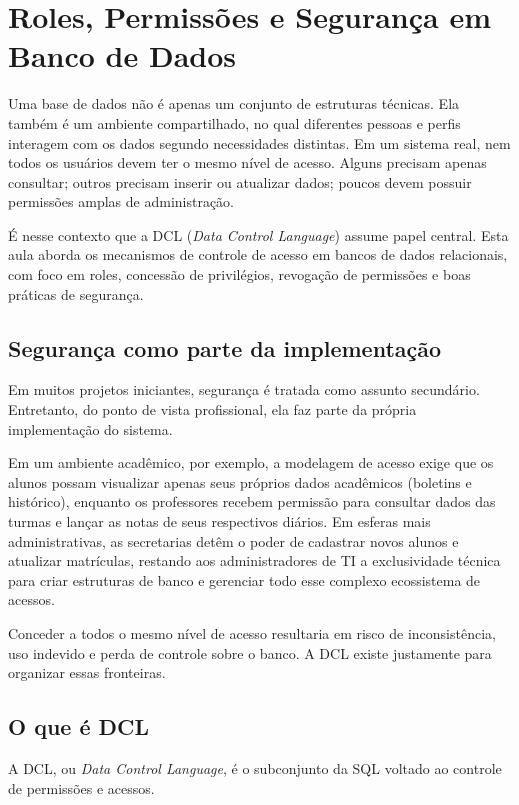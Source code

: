 \chapter{Roles, Permissões e Segurança em Banco de Dados}
\label{cap:roles_permissoes_seguranca}

Uma base de dados não é apenas um conjunto de estruturas técnicas. Ela também é um ambiente compartilhado, no qual diferentes pessoas e perfis interagem com os dados segundo necessidades distintas. Em um sistema real, nem todos os usuários devem ter o mesmo nível de acesso. Alguns precisam apenas consultar; outros precisam inserir ou atualizar dados; poucos devem possuir permissões amplas de administração.

É nesse contexto que a DCL (\textit{Data Control Language}) assume papel central. Esta aula aborda os mecanismos de controle de acesso em bancos de dados relacionais, com foco em roles, concessão de privilégios, revogação de permissões e boas práticas de segurança.

\section{Segurança como parte da implementação}

Em muitos projetos iniciantes, segurança é tratada como assunto secundário. Entretanto, do ponto de vista profissional, ela faz parte da própria implementação do sistema.

Em um ambiente acadêmico, por exemplo, a modelagem de acesso exige que os alunos possam visualizar apenas seus próprios dados acadêmicos (boletins e histórico), enquanto os professores recebem permissão para consultar dados das turmas e lançar as notas de seus respectivos diários. Em esferas mais administrativas, as secretarias detêm o poder de cadastrar novos alunos e atualizar matrículas, restando aos administradores de TI a exclusividade técnica para criar estruturas de banco e gerenciar todo esse complexo ecossistema de acessos.

Conceder a todos o mesmo nível de acesso resultaria em risco de inconsistência, uso indevido e perda de controle sobre o banco. A DCL existe justamente para organizar essas fronteiras.

\section{O que é DCL}

A DCL, ou \textit{Data Control Language}, é o subconjunto da SQL voltado ao controle de permissões e acessos.

